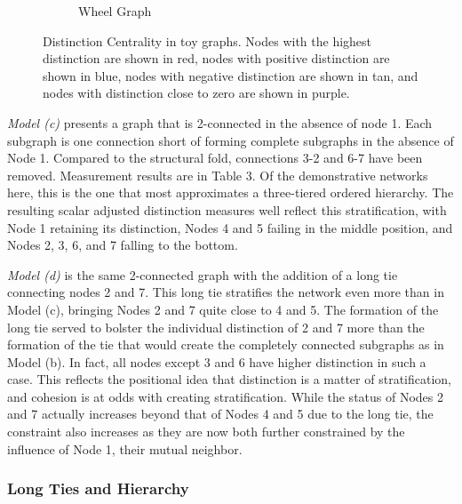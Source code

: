 \documentclass[12pt]{article}
\begin{document}
\begin{figure}
\begin{subfigure}[b]{0.35\textwidth}
            \caption{Wheel Graph}
            \label{fig:wheel}
    \end{subfigure}
    \label{fig:struct-folds}
    \caption{Distinction Centrality in toy graphs. Nodes with the highest distinction are shown in red, nodes with positive distinction are shown in blue, nodes with negative distinction are shown in tan, and nodes with distinction close to zero are shown in purple.}
\end{figure}

\textit{Model (c)} presents a graph that is 2-connected in the absence of node 1. Each subgraph is one connection short of forming complete subgraphs in the absence of Node 1. Compared to the structural fold, connections 3-2 and 6-7 have been removed. Measurement results are in Table 3. Of the demonstrative networks here, this is the one that most approximates a three-tiered ordered hierarchy. The resulting scalar adjusted distinction measures well reflect this stratification, with Node 1 retaining its distinction, Nodes 4 and 5 failing in the middle position, and Nodes 2, 3, 6, and 7 falling to the bottom. 

\textit{Model (d)} is the same 2-connected graph with the addition of a long tie connecting nodes 2 and 7. This long tie stratifies the network even more than in Model (c), bringing Nodes 2 and 7 quite close to 4 and 5. The formation of the long tie served to bolster the individual distinction of 2 and 7 more than the formation of the tie that would create the completely connected subgraphs as in Model (b). In fact, all nodes except 3 and 6 have higher distinction in such a case. This reflects the positional idea that distinction is a matter of stratification, and cohesion is at odds with creating stratification. While the status of Nodes 2 and 7 actually increases beyond that of Nodes 4 and 5 due to the long tie, the constraint also increases as they are now both further constrained by the influence of Node 1, their mutual neighbor.  

\subsubsection{Long Ties and Hierarchy}

\end{document}
